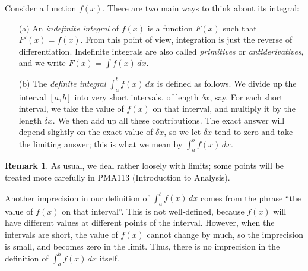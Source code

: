 \documentclass[a4paper]{book}
\newcommand{\PURPLE}[1]{{\color{purple}#1}}
\newcommand{\dl}        {\delta}
\renewcommand{\:}{\colon}
\newcommand{\PMA}[1]{PMA#1}
\newcommand{\DEFN}[1]{\PURPLE{\emph{#1}}}
\theoremstyle{definition}
\newtheorem{remark}[theorem]{Remark}
\begin{document}
Consider a function $f(x)$.  There are two main ways to think about
its integral:
\begin{itemize}
 \item[(a)] An \DEFN{indefinite integral} of $f(x)$ is a function
  $F(x)$ such that $F'(x)=f(x)$.  From this point of view, integration
  is just the reverse of differentiation.  Indefinite integrals are
  also called \DEFN{primitives} or \DEFN{antiderivatives}, and we
  write $F(x)=\int f(x)\,dx$.
 \item[(b)] The \DEFN{definite integral} $\int_a^bf(x)\,dx$ is defined
  as follows.  We divide up the interval $[a,b]$ into very short
  intervals, of length $\dl x$, say.  For each short interval, we take
  the value of $f(x)$ on that interval, and multiply it by the length
  $\dl x$.  We then add up all these contributions.  The exact answer
  will depend slightly on the exact value of $\dl x$, so we let
  $\dl x$ tend to zero and take the limiting answer; this is what we
  mean by $\int_a^bf(x)\, dx$.
\end{itemize}
\begin{remark}
 As usual, we deal rather loosely with limits; some points will be
 treated more carefully in \PMA{113} (Introduction to Analysis).

 Another imprecision in our definition of $\int_a^bf(x)\,dx$ comes
 from the phrase ``the value of $f(x)$ on that interval''.  This is
 not well-defined, because $f(x)$ will have different values at
 different points of the interval.  However, when the intervals are
 short, the value of $f(x)$ cannot change by much, so the imprecision
 is small, and becomes zero in the limit.  Thus, there is no
 imprecision in the definition of $\int_a^bf(x)\,dx$ itself.
\end{remark}
\end{document}

